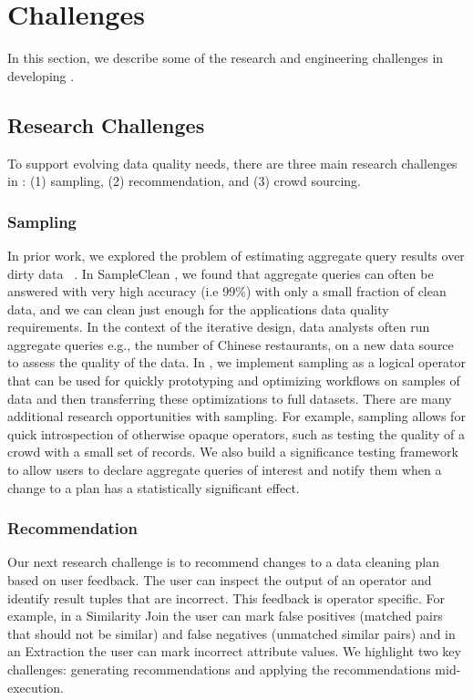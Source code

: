 \section{Challenges}
In this section, we describe some of the research and engineering challenges in developing \sys.

\subsection{Research Challenges}
To support evolving data quality needs, there are three main research challenges in \sys: (1) sampling, (2) recommendation, and (3) crowd sourcing.

\subsubsection{Sampling}
In prior work, we explored the problem of estimating aggregate query results over dirty data ~\cite{wang1999sample}.
In SampleClean \cite{wang1999sample}, we found that aggregate queries can often be answered with very high accuracy (i.e 99\%) with only a small fraction of clean data, and we can clean just enough for the applications data quality requirements.
In the context of the iterative design, data analysts often run aggregate queries e.g., the number of Chinese restaurants, on a new data source to assess the quality of the data.
In \sys, we implement sampling as a logical operator that can be used for quickly prototyping and optimizing workflows on samples of data and then transferring these optimizations to full datasets.
There are many additional research opportunities with sampling.
For example, sampling allows for quick introspection of otherwise opaque operators, such as testing the quality of a crowd with a small set of records.
We also build a significance testing framework to allow users to declare aggregate queries of interest and notify them when a change to 
a plan has a statistically significant effect.

\subsubsection{Recommendation}
Our next research challenge is to recommend changes to a data cleaning plan based on user feedback. 
The user can inspect the output of an operator and identify result tuples that are incorrect. This feedback is operator specific. For example, in a Similarity Join the user can mark false positives (matched pairs that should not be similar) and false negatives (unmatched similar pairs) and in an Extraction the user can mark incorrect attribute values. 
We highlight two key challenges: generating recommendations and applying the recommendations mid-execution.

